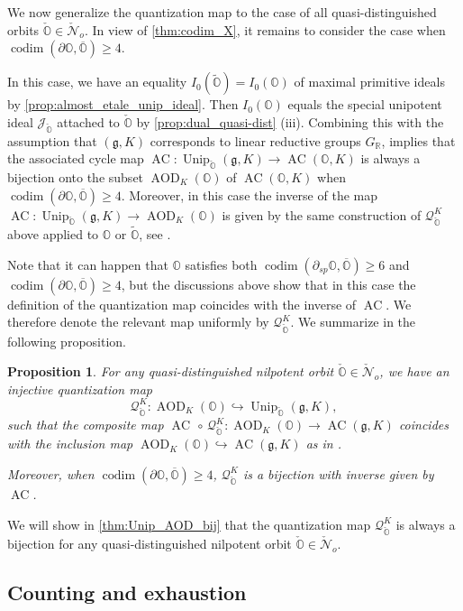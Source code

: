 \documentclass[11pt, a4paper]{amsart}
\newcommand{\J}{\mathcal{J}}
\newcommand{\g}{\mathfrak{g}}
\newcommand{\orb}{\mathbb{O}}
\newcommand{\ckorb}{\check{\orb}}
\newcommand{\cN}{\mathcal{N}}
\DeclareMathOperator{\codim}{codim}
\DeclareMathOperator{\AC}{AC}
\DeclareMathOperator{\AOD}{AOD}
\DeclareMathOperator{\Unip}{Unip}
\newcommand{\AODK}{\AOD_K}
\newcommand{\UnipOv}{\Unip_{\ckorb}}
\newcommand{\R}{\mathbb{R}}
\newcommand{\quan}{\mathcal{Q}}
\newcommand{\GR}{G_\R}
\newtheorem{Prop}[Thm]{Proposition}
\theoremstyle{definition}
\numberwithin{equation}{section}
\begin{document}
We now generalize the quantization map to the case of all quasi-distinguished orbits $\ckorb \in \check{\cN}_o$. In view of \cref{thm:codim_X}, it remains to consider the case when $\codim(\partial \orb, \overline{\orb}) \geqslant 4$. 

In this case, we have an equality $I_0(\widetilde{\orb}) = I_0(\orb)$ of maximal primitive ideals by \cref{prop:almost_etale_unip_ideal}. Then $I_0(\orb)$ equals the special unipotent ideal $\J_{\ckorb}$ attached to $\ckorb$ by \cref{prop:dual_quasi-dist} (iii). Combining this with the assumption that $(\g,K)$ corresponds to linear reductive groups $\GR$, \cite[Theorem 1.3.1]{LosevYu} implies that the associated cycle map $\AC: \UnipOv(\g, K) \to \AC(\orb, K)$ is always a bijection onto the subset $\AODK(\orb)$ of $\AC(\orb, K)$ when $\codim(\partial \orb, \overline{\orb}) \geqslant 4$. Moreover, in this case the inverse of the map $\AC: \UnipOv(\g, K) \to \AODK(\orb)$ is given by the same construction of $\quan_{\ckorb}^K$ above applied to $\orb$ or $\widetilde{\orb}$, see \cite[Section 5.7]{LosevYu}. 

Note that it can happen that $\orb$ satisfies both $\codim(\partial_{sp} \orb, \overline{\orb}) \geqslant 6$ and $\codim(\partial \orb, \overline{\orb}) \geqslant 4$, but the discussions above show that in this case the definition of the quantization map coincides with the inverse of $\AC$.
We therefore denote the relevant map uniformly by $\quan_{\ckorb}^K$. We summarize in the following proposition.


\begin{Prop} \label{prop:quant_map_quasi-dist}
	For any quasi-distinguished nilpotent orbit $\ckorb \in \check{\cN}_o$, we have an injective quantization map
	\[ \quan_{\ckorb}^K: \AODK(\orb) \hookrightarrow \UnipOv(\g, K), \]
	such that the composite map $\AC \,\circ \,\quan_{\ckorb}^K: \AODK(\orb) \to \AC(\g,K)$ coincides with the inclusion map $\AODK(\orb) \hookrightarrow \AC(\g,K)$ as in . 

	Moreover, when $\codim(\partial \orb, \overline{\orb}) \geqslant 4$, $\quan_{\ckorb}^K$ is a bijection with inverse given by $\AC$. 
\end{Prop}

We will show in \cref{thm:Unip_AOD_bij} that the quantization map $\quan_{\ckorb}^K$ is always a bijection for any quasi-distinguished nilpotent orbit $\ckorb \in \check{\cN}_o$.

\subsection{Counting and exhaustion} \label{subsec:counting}
\end{document}
